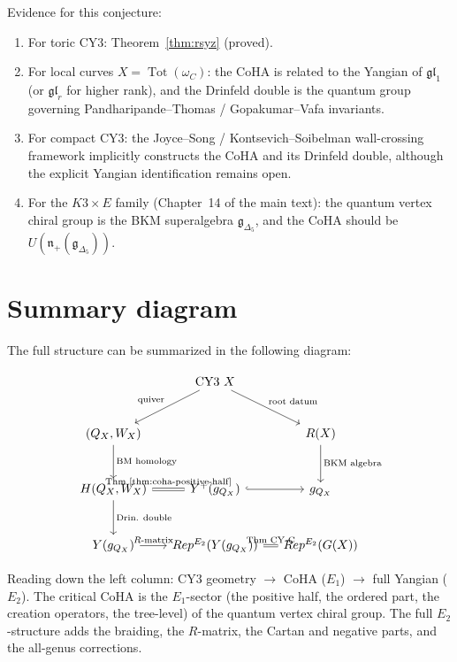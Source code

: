 \documentclass[11pt]{article}
\theoremstyle{definition}
\theoremstyle{remark}
\newcommand{\Rep}{\operatorname{Rep}}
\newcommand{\CoHA}{\mathcal{H}}
\newcommand{\cR}{\mathcal{R}}
\newcommand{\frakg}{\mathfrak{g}}
\newcommand{\frakn}{\mathfrak{n}}
\newcommand{\gl}{\mathfrak{gl}}
\begin{document}
\noindent
Evidence for this conjecture:
\begin{enumerate}[label=(\alph*)]
 \item For toric CY3: Theorem~\ref{thm:rsyz} (proved).
 \item For local curves $X = \operatorname{Tot}(\omega_C)$: the CoHA is
 related to the Yangian of $\gl_1$ (or $\gl_r$ for higher rank), and the
 Drinfeld double is the quantum group governing Pandharipande--Thomas /
 Gopakumar--Vafa invariants.
 \item For compact CY3: the Joyce--Song / Kontsevich--Soibelman wall-crossing
 framework implicitly constructs the CoHA and its Drinfeld double, although
 the explicit Yangian identification remains open.
 \item For the $K3 \times E$ family (Chapter~14 of the main text): the
 quantum vertex chiral group is the BKM superalgebra $\frakg_{\Delta_5}$,
 and the CoHA should be $U(\frakn_+(\frakg_{\Delta_5}))$.
\end{enumerate}


\section{Summary diagram}
\label{sec:summary}

The full structure can be summarized in the following diagram:

\[
\begin{tikzcd}[column sep=small, row sep=large]
 & \text{CY3 } X \arrow[dl, "\text{quiver}"'] \arrow[dr, "\text{root datum}"] & \\
 (Q_X, W_X) \arrow[d, "\text{BM homology}"] & &
 \cR(X) \arrow[d, "\text{BKM algebra}"] \\
 \CoHA(Q_X, W_X) \arrow[r, equal, "\text{Thm \ref{thm:coha-positive-half}}"]
 \arrow[d, "\text{Drin. double}"]
 & Y^+(\widehat{\frakg}_{Q_X}) \arrow[r, hook]
 & \frakg_{Q_X} \\
 Y(\widehat{\frakg}_{Q_X}) \arrow[r, "\text{$R$-matrix}"]
 & \Rep^{E_2}(Y(\widehat{\frakg}_{Q_X}))
 \arrow[r, equal, "\text{Thm CY-C}"]
 & \Rep^{E_2}(G(X))
\end{tikzcd}
\]

\noindent
Reading down the left column: CY3 geometry $\to$ CoHA ($E_1$) $\to$ full Yangian
($E_2$). The critical CoHA is the $E_1$-sector (the positive half, the
ordered part, the creation operators, the tree-level) of the quantum vertex
chiral group. The full $E_2$-structure adds the braiding, the $R$-matrix, the
Cartan and negative parts, and the all-genus corrections.
\end{document}
